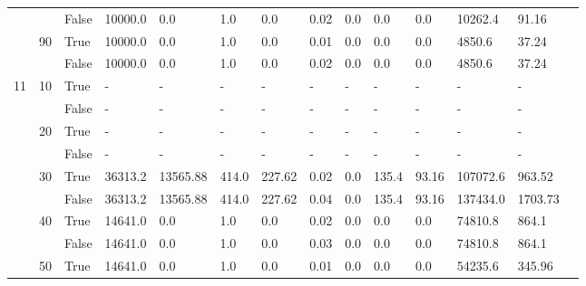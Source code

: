 \documentclass{article}
\begin{document}
\begin{landscape}
\begin{small}
\begin{longtable}[c]{@{}lll|ll|ll|ll|ll|lll@{}}
   &    & False & 10000.0         & 0.0            & 1.0           & 0.0           & 0.02          & 0.0           & 0.0           & 0.0           & 10262.4       & 91.16       &  \\
   & 90 & True  & 10000.0         & 0.0            & 1.0           & 0.0           & 0.01          & 0.0           & 0.0           & 0.0           & 4850.6        & 37.24       &  \\
   &    & False & 10000.0         & 0.0            & 1.0           & 0.0           & 0.02          & 0.0           & 0.0           & 0.0           & 4850.6        & 37.24       &  \\
  \midrule
11 & 10 & True  & -               & -              & -             & -             & -             & -             & -             & -             & -             & -           &  \\
   &    & False & -               & -              & -             & -             & -             & -             & -             & -             & -             & -           &  \\
   & 20 & True  & -               & -              & -             & -             & -             & -             & -             & -             & -             & -           &  \\
   &    & False & -               & -              & -             & -             & -             & -             & -             & -             & -             & -           &  \\
   & 30 & True  & 36313.2         & 13565.88       & 414.0         & 227.62        & 0.02          & 0.0           & 135.4         & 93.16         & 107072.6      & 963.52      &  \\
   &    & False & 36313.2         & 13565.88       & 414.0         & 227.62        & 0.04          & 0.0           & 135.4         & 93.16         & 137434.0      & 1703.73     &  \\
   & 40 & True  & 14641.0         & 0.0            & 1.0           & 0.0           & 0.02          & 0.0           & 0.0           & 0.0           & 74810.8       & 864.1       &  \\
   &    & False & 14641.0         & 0.0            & 1.0           & 0.0           & 0.03          & 0.0           & 0.0           & 0.0           & 74810.8       & 864.1       &  \\
   & 50 & True  & 14641.0         & 0.0            & 1.0           & 0.0           & 0.01          & 0.0           & 0.0           & 0.0           & 54235.6       & 345.96      &  \\

\end{longtable}
\end{small}
\end{landscape}
\end{document}
